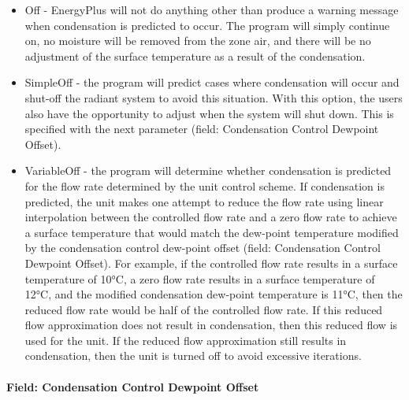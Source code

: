 \begin{itemize}
\item
  Off - EnergyPlus will not do anything other than produce a warning message when condensation is predicted to occur. The program will simply continue on, no moisture will be removed from the zone air, and there will be no adjustment of the surface temperature as a result of the condensation.
\item
  SimpleOff - the program will predict cases where condensation will occur and shut-off the radiant system to avoid this situation. With this option, the users also have the opportunity to adjust when the system will shut down. This is specified with the next parameter (field: Condensation Control Dewpoint Offset).
\item
  VariableOff - the program will determine whether condensation is predicted for the flow rate determined by the unit control scheme.  If condensation is predicted, the unit makes one attempt to reduce the flow rate using linear interpolation between the controlled flow rate and a zero flow rate to achieve a surface temperature that would match the dew-point temperature modified by the condensation control dew-point offset (field: Condensation Control Dewpoint Offset). For example, if the controlled flow rate results in a surface temperature of 10°C, a zero flow rate results in a surface temperature of 12°C, and the modified condensation dew-point temperature is 11°C, then the reduced flow rate would be half of the controlled flow rate.  If this reduced flow approximation does not result in condensation, then this reduced flow is used for the unit.  If the reduced flow approximation still results in condensation, then the unit is turned off to avoid excessive iterations.
\end{itemize}

\paragraph{Field: Condensation Control Dewpoint Offset}\label{field-condensation-control-dewpoint-offset}

